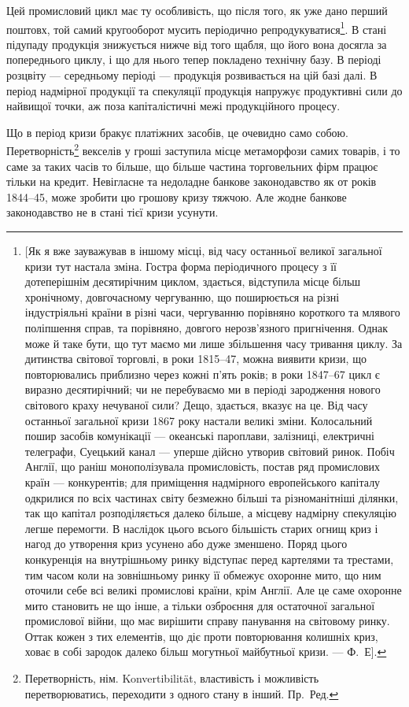 Цей промисловий цикл має ту особливість, що після того, як уже дано перший
поштовх, той самий кругооборот мусить періодично репродукуватися\footnote{
[Як я вже зауважував в іншому місці, від часу останньої великої загальної кризи тут настала
зміна. Гостра форма періодичного процесу з її дотеперішнім десятирічним циклом, здається, відступила
місце більш хронічному, довгочасному чергуванню, що поширюється на різні індустріяльні країни в
різні
часи, чергуванню порівняно короткого та млявого поліпшення справ, та порівняно, довгого
нерозв'язного
пригнічення. Однак може й таке бути, що тут маємо ми лише збільшення часу тривання циклу. За
дитинства
світової торговлі, в роки 1815--47, можна виявити кризи, що повторювались приблизно через
кожні п’ять років; в роки 1847--67 цикл є виразно десятирічний; чи не перебуваємо ми в періоді
зародження нового світового краху нечуваної сили? Дещо, здається, вказує на це. Від часу останньої
загальної кризи 1867 року настали великі зміни. Колосальний пошир засобів комунікації — океанські
пароплави,
залізниці, електричні телеграфи, Суецький канал — уперше дійсно утворив світовий ринок. Побіч
Англії, що раніш монополізувала промисловість, постав ряд промислових країн — конкурентів; для
приміщення надмірного европейського капіталу одкрилися по всіх частинах світу безмежно більші та
різноманітніші ділянки, так що капітал розподіляється далеко більше, а місцеву надмірну спекуляцію
легше перемогти. В наслідок цього всього більшість старих огнищ криз і нагод до утворення криз
усунено
або дуже зменшено. Поряд цього конкуренція на внутрішньому ринку відступає перед картелями та
трестами, тим часом коли на зовнішньому ринку її обмежує охоронне мито, що ним оточили себе всі
великі
промислові країни, крім Англії. Але це саме охоронне мито становить не що інше, а тільки озброєння
для остаточної загальної промислової війни, що має вирішити справу панування на світовому ринку.
Оттак кожен з тих елементів, що діє проти повторювання колишніх криз, ховає в собі зародок далеко
більш могутньої майбутньої кризи. — Ф.~Е].
}. В стані
підупаду продукція знижується нижче від того щабля, що його вона досягла
за попереднього циклу, і що для нього тепер покладено технічну базу. В періоді
розцвіту — середньому періоді — продукція розвивається на цій базі далі. В період
надмірної продукції та спекуляції продукція напружує продуктивні сили до найвищої
точки, аж поза капіталістичні межі продукційного процесу.

Що в період кризи бракує платіжних засобів, це очевидно само собою.
Перетворність\footnote*{
Перетворність, нім. Konvertibilität, властивість і можливість перетворюватись, переходити
з одного стану в інший. Пр.~Ред.
} векселів у гроші заступила місце метаморфози самих товарів,
і то саме за таких часів то більше, що більше частина торговельних фірм працює
тільки на кредит. Невігласне та недоладне банкове законодавство як от
років 1844--45, може зробити цю грошову кризу тяжчою. Але жодне банкове
законодавство не в стані тієї кризи усунути.

